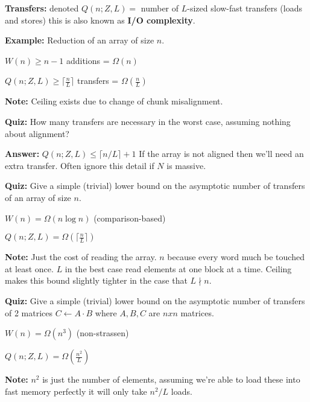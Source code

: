 \documentclass{amsart}
\begin{document}
	\textbf{Transfers:} denoted $Q(n;Z,L)=$ number of $L$-sized slow-fast transfers (loads and stores) this is also known as \textbf{I/O complexity}.
	\begin{mdframed}[style=Example]
		\textbf{Example:} Reduction of an array of size $n$.
		\vspace{2mm}
		
		$W(n) \geq n-1$ additions = $\Omega(n)$
		
		$Q(n;Z,L) \geq \lceil\frac{n}{L}\rceil$ transfers = $\Omega(\frac{n}{L})$
		\vspace{2mm}
		
		\noindent
		\textbf{Note:} Ceiling exists due to change of chunk misalignment.
	\end{mdframed}
	\begin{mdframed}[style=Quiz]
		\textbf{Quiz:} How many transfers are necessary in the worst case, assuming nothing about alignment?
		\vspace{2mm}
		
		\noindent
		\textbf{Answer:} $Q(n;Z,L) \leq \lceil n/L \rceil + 1$  If the array is not aligned then we'll need an extra transfer. Often ignore this detail if $N$ is massive.
	\end{mdframed}
	\begin{mdframed}[style=Quiz]
		\textbf{Quiz:} Give a simple (trivial) lower bound on the asymptotic number of transfers of an array of size $n$.
		\vspace{2mm}
		
		$W(n) = \Omega(n\log n)$ (comparison-based)
		
		$Q(n;Z,L) = \Omega(\lceil\frac{n}{L}\rceil)$
		\vspace{2mm}
		
		\noindent
		\textbf{Note:} Just the cost of reading the array. \textbf{$n$} because every word much be touched at least once. \textbf{$L$} in the best case read elements at one block at a time.  Ceiling makes this bound slightly tighter in the case that $L \nmid n$.
	\end{mdframed}
	\begin{mdframed}[style=Quiz]
		\textbf{Quiz:} Give a simple (trivial) lower bound on the asymptotic number of transfers of 2 matrices $C \leftarrow A \cdot B$ where $A, B, C$ are $nxn$ matrices.
		\vspace{2mm}
		
		$W(n) = \Omega(n^3)$ (non-strassen)
		
		$Q(n;Z,L) = \Omega(\frac{n^2}{L})$
		\vspace{2mm}
		
		\noindent
		\textbf{Note:} $n^2$ is just the number of elements, assuming we're able to load these into fast memory perfectly it will only take $n^2/L$ loads.
	\end{mdframed}
	\vspace{2mm}
\end{document}
